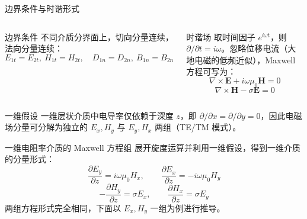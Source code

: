 \documentclass[10pt,aspectratio=169,fontset=none]{ctexbeamer}
\begin{document}
    \begin{frame}{边界条件与时谐形式}
        \begin{columns}[T]
            \begin{block}{边界条件}
                不同介质分界面上，切向分量连续，法向分量连续：
                \begin{equation*}
                    E_{1t}=E_{2t},\ H_{1t}=H_{2t},\quad
                    D_{1n}=D_{2n},\ B_{1n}=B_{2n}
                \end{equation*}
            \end{block}

            \begin{block}{时谐场}
                取时间因子 $e^{i\omega t}$，则 $\partial/\partial t=i\omega$。忽略位移电流（大地电磁的低频近似），Maxwell 方程可写为：
                \begin{equation}
                    \nabla\times \boldsymbol{E} + i\omega\mu_0 \boldsymbol{H}=0
                \end{equation}
                \begin{equation}
                    \nabla\times \boldsymbol{H} - \sigma \boldsymbol{E}=0
                \end{equation}
            \end{block}
        \end{columns}
        \vspace{0.4em}
        \begin{tblock}{一维假设}
            一维层状介质中电导率仅依赖于深度 $z$，即 $\partial/\partial x=\partial/\partial y=0$，因此电磁场分量可分解为独立的 $E_x,H_y$ 与 $E_y,H_x$ 两组（TE/TM 模式）。
        \end{tblock}
    \end{frame}

    \begin{frame}{一维电阻率介质的 Maxwell 方程组}
        展开旋度运算并利用一维假设，得到一维介质的分量形式：
        \begin{equation}
            \frac{\partial E_y}{\partial z} = i\omega \mu_0 H_x,\qquad
            \frac{\partial E_x}{\partial z} = -i\omega \mu_0 H_y
        \end{equation}
        \begin{equation}
            -\frac{\partial H_y}{\partial z} = \sigma E_x,\qquad
            \frac{\partial H_x}{\partial z} = \sigma E_y
        \end{equation}
        \vspace{0.3em}
        两组方程形式完全相同，下面以 $E_x, H_y$ 一组为例进行推导。
    \end{frame}
\end{document}
